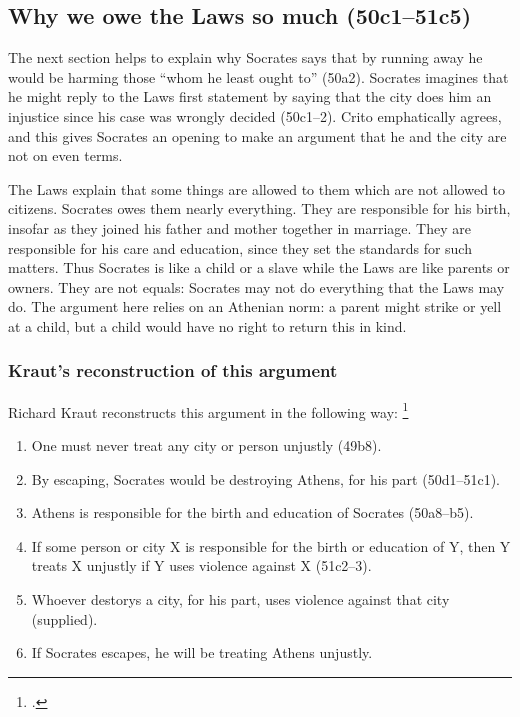 \documentclass[12pt,letterpaper]{article}
\begin{document}
\subsection*{Why we owe the Laws so much (50c1--51c5)}

The next section helps to explain why Socrates says that by running away he would be harming those ``whom he least ought to'' (50a2).
Socrates imagines that he might reply to the Laws first statement by saying that the city does him an injustice since his case was wrongly decided (50c1--2).
Crito emphatically agrees, and this gives Socrates an opening to make an argument that he and the city are not on even terms.

The Laws explain that some things are allowed to them which are not allowed to citizens.
Socrates owes them nearly everything.
They are responsible for his birth, insofar as they joined his father and mother together in marriage.
They are responsible for his care and education, since they set the standards for such matters.
Thus Socrates is like a child or a slave while the Laws are like parents or owners.
They are not equals: Socrates may not do everything that the Laws may do.
The argument here relies on an Athenian norm: a parent might strike or yell at a child, but a child would have no right to return this in kind.

\subsubsection*{Kraut's reconstruction of this argument}

Richard Kraut reconstructs this argument in the following way:%
\footcite[][50]{kraut-socrates-state-1984}

\begin{enumerate}

    \item One must never treat any city or person unjustly (49b8).

    \item By escaping, Socrates would be destroying Athens, for his part (50d1--51c1).

    \item Athens is responsible for the birth and education of Socrates (50a8--b5).

    \item If some person or city X is responsible for the birth or education of Y, then Y treats X unjustly if Y uses violence against X (51c2--3).

    \item Whoever destorys a city, for his part, uses violence against that city (supplied).

    \item If Socrates escapes, he will be treating Athens unjustly.

\end{enumerate}
\end{document}
